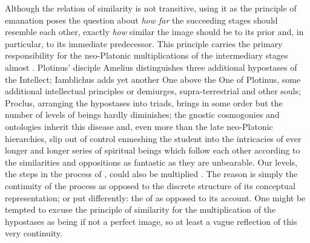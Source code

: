 Although the relation of similarity is not transitive, using it as the
principle of emanation poses the question about {\em how far} the succeeding
stages should resemble each other, exactly {\em how} similar the image should be
to its prior and, in particular, to its immediate predecessor. This principle
carries the primary responsibility for the 
neo-Platonic multiplications of the intermediary stages almost . Plotinus' disciple Amelius distinguishes three additional
hypostases of the Intellect; Iamblichus adds yet another One above the One of
Plotinus, some additional intellectual principles or demiurges, supra-terrestrial
and other souls; Proclus, arranging the hypostases into triads, brings in some
order but the number of levels of beings hardly diminishes;
the gnostic cosmogonies and ontologies inherit this disease and, even more than
the late neo-Platonic hierarchies, slip out of control enmeshing the student
into the intricacies of ever longer and longer series of spiritual beings which
follow each other according to the similarities and oppositions as fantastic as
they are unbearable. Our
levels, the steps in the process of , could also be multiplied
. The reason is simply the continuity of the process as opposed
to the discrete structure of its conceptual representation; or put differently:
the  of  as opposed to its 
account.
One might be tempted to excuse the principle of similarity for the
multiplication of the hypostases as being if not a perfect image, so at least a
vague reflection of this very continuity.

